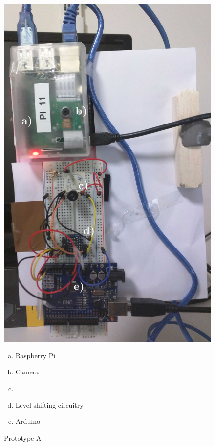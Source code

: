 \documentclass[../thesis/thesis.tex]{subfiles}
\begin{document}
\begin{figure}
\centering
\includegraphics[height=0.7\textheight]{../diagrams/prototypea.jpg}
{\small
\begin{enumerate}[a)]
 \item Raspberry Pi
 \item Camera
 \item \mlx
 \item Level-shifting circuitry
 \item Arduino
\end{enumerate}
}
\caption{Prototype A}
\label{fig:pictures:protoa}
\end{figure}
\end{document}
